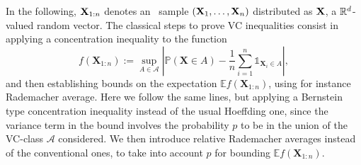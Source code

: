 In the following, $\mathbf X_{1:n}$ denotes an \iid~sample $(\mathbf
X_1,\ldots,\mathbf X_n)$ distributed as  $\mathbf X$,  a $\mathbb R^d$-valued random vector. The classical steps to prove VC inequalities consist in applying a
concentration inequality to the function
\begin{equation}
  \label{colt:eq:fsupdev}
  f(\mathbf{X}_{1:n}):= \sup_{A \in \mathcal{A}}
\left | \mathbb{P}(\mathbf{X} \in A) - \frac{1}{n} \sum_{i=1}^n
  \mathds{1}_{\mathbf{X}_i \in A} \right|, 
\end{equation}
 and then  establishing  bounds
on the expectation $\mathbb{E}f(\mathbf{X}_{1:n})$, using for instance
Rademacher average. Here we follow the same lines, but applying a
Bernstein type concentration inequality instead of the usual Hoeffding
one, since the variance term in the bound involves the probability $p$
to be in the union of the VC-class $\mathcal{A}$ considered. We then
introduce relative Rademacher averages instead of the conventional
ones, to take into account  $p$ for bounding  $\mathbb{E}f(\mathbf{X}_{1:n})$. 

